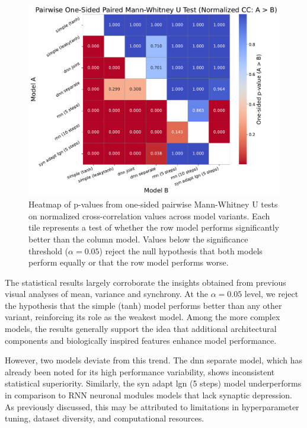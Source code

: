 \begin{figure}
    \centering
    \includegraphics[width=\linewidth]{img/plots/model_types_p_value_heatmap_cc_norm.pdf}
    \caption{Heatmap of p-values from one-sided pairwise Mann-Whitney U tests on normalized cross-correlation values across model variants. Each tile represents a test of whether the row model performs significantly better than the column model. Values below the significance threshold ($\alpha = 0.05$) reject the null hypothesis that both models perform equally or that the row model performs worse.}
    \label{fig:model_types_p_values_heatmap}
\end{figure}

The statistical results largely corroborate the insights obtained from previous visual analyses of mean, variance and synchrony. At the $\alpha = 0.05$ level, we reject the hypothesis that the simple (tanh) model performs better than any other variant, reinforcing its role as the weakest model. Among the more complex models, the results generally support the idea that additional architectural components and biologically inspired features enhance model performance.

However, two models deviate from this trend. The dnn separate model, which has already been noted for its high performance variability, shows inconsistent statistical superiority. Similarly, the syn adapt lgn (5 steps) model underperforms in comparison to RNN neuronal modules models that lack synaptic depression. As previously discussed, this may be attributed to limitations in hyperparameter tuning, dataset diversity, and computational resources.

